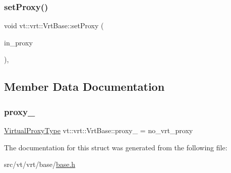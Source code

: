 \mbox{\label{structvt_1_1vrt_1_1_vrt_base_aa85b1aa3096a2adffe229927d76cebfd}} 
\subsubsection{\texorpdfstring{set\+Proxy()}{setProxy()}}
{\footnotesize\ttfamily void vt\+::vrt\+::\+Vrt\+Base\+::set\+Proxy (\begin{DoxyParamCaption}\item[{\hyperlink{namespacevt_a1b417dd5d684f045bb58a0ede70045ac}{Virtual\+Proxy\+Type} const \&}]{in\+\_\+proxy }\end{DoxyParamCaption})\hspace{0.3cm}{\ttfamily [inline]}, {\ttfamily [protected]}}



\subsection{Member Data Documentation}
\mbox{\label{structvt_1_1vrt_1_1_vrt_base_a1904e5218715dc8f4ec7c186ce4ffee3}} 
\subsubsection{\texorpdfstring{proxy\+\_\+}{proxy\_}}
{\footnotesize\ttfamily \hyperlink{namespacevt_a1b417dd5d684f045bb58a0ede70045ac}{Virtual\+Proxy\+Type} vt\+::vrt\+::\+Vrt\+Base\+::proxy\+\_\+ = no\+\_\+vrt\+\_\+proxy\hspace{0.3cm}{\ttfamily [private]}}



The documentation for this struct was generated from the following file\+:\begin{DoxyCompactItemize}
\item 
src/vt/vrt/base/\hyperlink{vrt_2base_2base_8h}{base.\+h}\end{DoxyCompactItemize}
